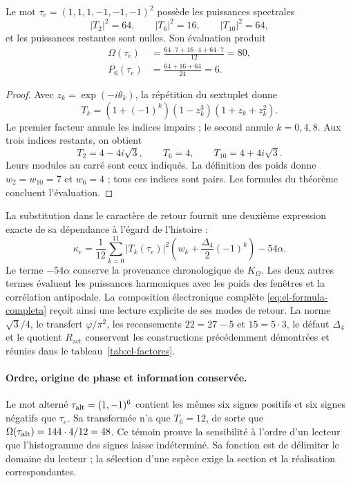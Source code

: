 \begin{corollary}
\label{cor:el-tres-modos}
Le mot \(\tau_e=(1,1,1,-1,-1,-1)^2\) possède les puissances
spectrales
\begin{equation}
 |T_2|^2=64,\qquad |T_6|^2=16,\qquad |T_{10}|^2=64,
 \label{eq:el-potencias-espectrales}
\end{equation}
et les puissances restantes sont nulles. Son évaluation produit
\begin{equation}
 \begin{aligned}
 \Omega(\tau_e)&=\frac{64\cdot7+16\cdot4+64\cdot7}{12}=80,\\
 P_6(\tau_e)&=\frac{64+16+64}{24}=6.
 \end{aligned}
 \label{eq:el-evaluacion-espectral}
\end{equation}
\end{corollary}
\begin{proof}
Avec \(z_k=\exp(-i\theta_k)\), la répétition du sextuplet donne
\[
 T_k=(1+(-1)^k)(1-z_k^3)(1+z_k+z_k^2).
\]
Le premier facteur annule les indices impairs ; le second annule \(k=0,4,8\). Aux trois indices restants, on obtient
\[
 T_2=4-4i\sqrt3,\qquad T_6=4,\qquad T_{10}=4+4i\sqrt3.
\]
Leurs modules au carré sont ceux indiqués. La définition des
poids donne \(w_2=w_{10}=7\) et \(w_6=4\) ; tous ces indices sont
pairs. Les formules du théorème concluent l'évaluation.
\end{proof}

La substitution dans le caractère de retour fournit une deuxième expression exacte de sa dépendance à l'égard de l'histoire :
\begin{equation}
 \kappa_e=
 \frac1{12}\sum_{k=0}^{11}|T_k(\tau_e)|^2
       \left(w_k+\frac{\Delta_4}{2}(-1)^k\right)-54\alpha.
 \label{eq:el-kappa-espectral}
\end{equation}
Le terme \(-54\alpha\) conserve la provenance chronologique
de \(K_\Omega\). Les deux autres termes évaluent les puissances
harmoniques avec les poids des fenêtres et la corrélation
antipodale. La composition électronique complète
\eqref{eq:el-formula-completa} reçoit ainsi une lecture explicite
de ses modes de retour. La norme \(\sqrt3/4\), le transfert
\(\varphi/\pi^2\), les recensements \(22=27-5\) et \(15=5\cdot3\),
le défaut \(\Delta_4\) et le quotient \(R_{\mathrm{act}}\)
conservent les constructions précédemment démontrées et réunies dans
le tableau~\ref{tab:el-factores}.

\paragraph{Ordre, origine de phase et information conservée.}
Le mot alterné \(\tau_{\rm alt}=(1,-1)^6\) contient les mêmes six signes positifs et six signes négatifs que \(\tau_e\). Sa transformée n'a que \(T_6=12\), de sorte que \(\Omega(\tau_{\rm alt})=144\cdot4/12=48\). Ce témoin prouve la sensibilité à l'ordre d'un lecteur que l'histogramme des signes laisse indéterminé. Sa fonction est de délimiter le domaine du lecteur ; la sélection d'une espèce exige la section et la réalisation correspondantes.

